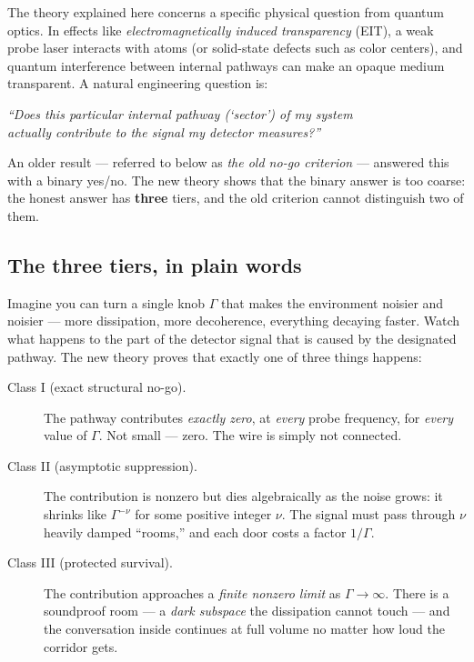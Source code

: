 \documentclass[11pt]{article}
\begin{document}
The theory explained here concerns a specific physical question from quantum
optics.  In effects like \emph{electromagnetically induced transparency}
(EIT), a weak probe laser interacts with atoms (or solid-state defects such as
color centers), and quantum interference between internal pathways can make an
opaque medium transparent.  A natural engineering question is:

\begin{center}
\emph{``Does this particular internal pathway (`sector') of my system\\
actually contribute to the signal my detector measures?''}
\end{center}

An older result --- referred to below as \emph{the old no-go criterion} ---
answered this with a binary yes/no.  The new theory shows that the binary
answer is too coarse: the honest answer has \textbf{three} tiers, and the old
criterion cannot distinguish two of them.

\subsection{The three tiers, in plain words}

Imagine you can turn a single knob $\Gamma$ that makes the environment noisier
and noisier --- more dissipation, more decoherence, everything decaying
faster.  Watch what happens to the part of the detector signal that is caused
by the designated pathway.  The new theory proves that exactly one of three
things happens:

\begin{description}
\item[Class I (exact structural no-go).]  The pathway contributes
\emph{exactly zero}, at \emph{every} probe frequency, for \emph{every} value
of $\Gamma$.  Not small --- zero.  The wire is simply not connected.
\item[Class II (asymptotic suppression).]  The contribution is nonzero but
dies algebraically as the noise grows: it shrinks like $\Gamma^{-\nu}$ for
some positive integer $\nu$.  The signal must pass through $\nu$ heavily
damped ``rooms,'' and each door costs a factor $1/\Gamma$.
\item[Class III (protected survival).]  The contribution approaches a
\emph{finite nonzero limit} as $\Gamma\to\infty$.  There is a soundproof room
--- a \emph{dark subspace} the dissipation cannot touch --- and the
conversation inside continues at full volume no matter how loud the corridor
gets.
\end{description}
\end{document}
